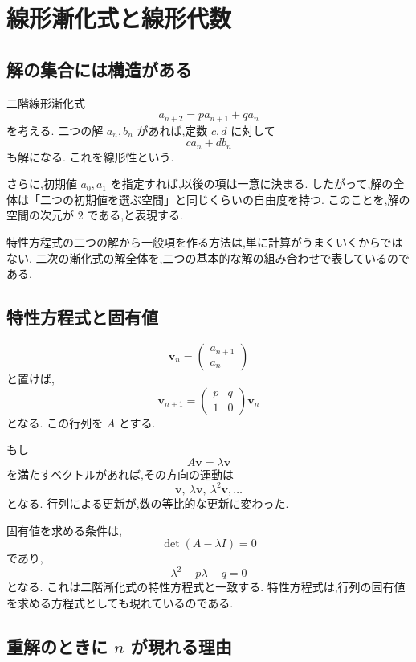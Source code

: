 
\section{線形漸化式と線形代数}

\subsection{解の集合には構造がある}

二階線形漸化式
\[
  a_{n+2}=pa_{n+1}+qa_n
\]
を考える.
二つの解 $a_n,b_n$ があれば,定数 $c,d$ に対して
\[
  c a_n+d b_n
\]
も解になる.
これを線形性という.

さらに,初期値 $a_0,a_1$ を指定すれば,以後の項は一意に決まる.
したがって,解の全体は「二つの初期値を選ぶ空間」と同じくらいの自由度を持つ.
このことを,解の空間の次元が $2$ である,と表現する.

特性方程式の二つの解から一般項を作る方法は,単に計算がうまくいくからではない.
二次の漸化式の解全体を,二つの基本的な解の組み合わせで表しているのである.

\subsection{特性方程式と固有値}

\[
  \boldsymbol v_n=
  \begin{pmatrix}a_{n+1}\\a_n\end{pmatrix}
\]
と置けば,
\[
  \boldsymbol v_{n+1}
  =
  \begin{pmatrix}p&q\\1&0\end{pmatrix}
  \boldsymbol v_n
\]
となる.
この行列を $A$ とする.

もし
\[
  A\boldsymbol v=\lambda\boldsymbol v
\]
を満たすベクトルがあれば,その方向の運動は
\[
  \boldsymbol v,\ \lambda\boldsymbol v,\ \lambda^2\boldsymbol v,\ldots
\]
となる.
行列による更新が,数の等比的な更新に変わった.

固有値を求める条件は,
\[
  \det(A-\lambda I)=0
\]
であり,
\[
  \lambda^2-p\lambda-q=0
\]
となる.
これは二階漸化式の特性方程式と一致する.
特性方程式は,行列の固有値を求める方程式としても現れているのである.

\subsection{重解のときに $n$ が現れる理由}

